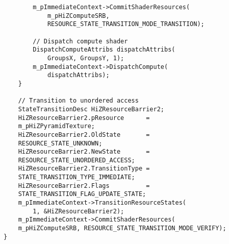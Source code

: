 \begin{lstlisting}
        m_pImmediateContext->CommitShaderResources(
            m_pHiZComputeSRB, 
            RESOURCE_STATE_TRANSITION_MODE_TRANSITION);

        // Dispatch compute shader
        DispatchComputeAttribs dispatchAttribs(
            GroupsX, GroupsY, 1);
        m_pImmediateContext->DispatchCompute(
            dispatchAttribs);
    }

    // Transition to unordered access
    StateTransitionDesc HiZResourceBarrier2;
    HiZResourceBarrier2.pResource      = 
    m_pHiZPyramidTexture;
    HiZResourceBarrier2.OldState       = 
    RESOURCE_STATE_UNKNOWN;
    HiZResourceBarrier2.NewState       = 
    RESOURCE_STATE_UNORDERED_ACCESS;
    HiZResourceBarrier2.TransitionType = 
    STATE_TRANSITION_TYPE_IMMEDIATE;
    HiZResourceBarrier2.Flags          = 
    STATE_TRANSITION_FLAG_UPDATE_STATE;
    m_pImmediateContext->TransitionResourceStates(
        1, &HiZResourceBarrier2);
    m_pImmediateContext->CommitShaderResources(
    m_pHiZComputeSRB, RESOURCE_STATE_TRANSITION_MODE_VERIFY);
}
\end{lstlisting}

